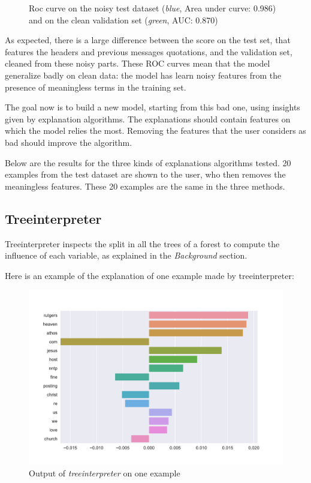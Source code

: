 \documentclass[a4paper,11pt]{kth-mag}
\begin{document}
\begin{figure}[h!]
		\centering
    	\def\svgwidth{\columnwidth}
    	\resizebox{0.75\textwidth}{!}{}
    	\caption{Roc curve on the noisy test dataset (\textit{blue}, Area under curve: 0.986) and on the clean validation set (\textit{green}, AUC: 0.870)}
\end{figure}

As expected, there is a large difference between the score on the test set, that features the headers and previous messages quotations, and the validation set, cleaned from these noisy parts. These ROC curves mean that the model generalize badly on clean data: the model has learn noisy features from the presence of meaningless terms in the training set.

The goal now is to build a new model, starting from this bad one, using insights given by explanation algorithms. The explanations should contain features on which the model relies the most. Removing the features that the user considers as bad should improve the algorithm.

Below are the results for the three kinds of explanations algorithms tested. 20 examples from the test dataset are shown to the user, who then removes the meaningless features. These 20 examples are the same in the three methods.

\subsection{Treeinterpreter}

Treeinterpreter inspects the split in all the trees of a forest to compute the influence of each variable, as explained in the \textit{Background} section.

Here is an example of the explanation of one example made by treeinterpreter:

\begin{figure}[!h]
	\centering
   	\def\svgwidth{\columnwidth}
	\includegraphics[scale=0.35]{img/tree_interpreter.pdf}
    \caption{Output of \textit{treeinterpreter} on one example}
\end{figure}
\end{document}
